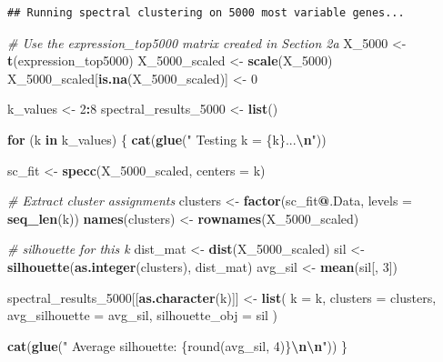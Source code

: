 \documentclass[
]{article}
\newenvironment{Shaded}{\begin{snugshade}}{\end{snugshade}}
\newcommand{\AttributeTok}[1]{\textcolor[rgb]{0.13,0.29,0.53}{#1}}
\newcommand{\CommentTok}[1]{\textcolor[rgb]{0.56,0.35,0.01}{\textit{#1}}}
\newcommand{\ControlFlowTok}[1]{\textcolor[rgb]{0.13,0.29,0.53}{\textbf{#1}}}
\newcommand{\DecValTok}[1]{\textcolor[rgb]{0.00,0.00,0.81}{#1}}
\newcommand{\FunctionTok}[1]{\textcolor[rgb]{0.13,0.29,0.53}{\textbf{#1}}}
\newcommand{\NormalTok}[1]{#1}
\newcommand{\OtherTok}[1]{\textcolor[rgb]{0.56,0.35,0.01}{#1}}
\newcommand{\SpecialCharTok}[1]{\textcolor[rgb]{0.81,0.36,0.00}{\textbf{#1}}}
\newcommand{\StringTok}[1]{\textcolor[rgb]{0.31,0.60,0.02}{#1}}
\begin{document}
\begin{verbatim}
## Running spectral clustering on 5000 most variable genes...
\end{verbatim}

\begin{Shaded}
\begin{Highlighting}[]
\CommentTok{\# Use the expression\_top5000 matrix created in Section 2a}
\NormalTok{X\_5000 }\OtherTok{\textless{}{-}} \FunctionTok{t}\NormalTok{(expression\_top5000)}
\NormalTok{X\_5000\_scaled }\OtherTok{\textless{}{-}} \FunctionTok{scale}\NormalTok{(X\_5000)}
\NormalTok{X\_5000\_scaled[}\FunctionTok{is.na}\NormalTok{(X\_5000\_scaled)] }\OtherTok{\textless{}{-}} \DecValTok{0}

\NormalTok{k\_values }\OtherTok{\textless{}{-}} \DecValTok{2}\SpecialCharTok{:}\DecValTok{8}
\NormalTok{spectral\_results\_5000 }\OtherTok{\textless{}{-}} \FunctionTok{list}\NormalTok{()}

\ControlFlowTok{for}\NormalTok{ (k }\ControlFlowTok{in}\NormalTok{ k\_values) \{}
  \FunctionTok{cat}\NormalTok{(}\FunctionTok{glue}\NormalTok{(}\StringTok{"  Testing k = \{k\}...}\SpecialCharTok{\textbackslash{}n}\StringTok{"}\NormalTok{))}
  
\NormalTok{  sc\_fit }\OtherTok{\textless{}{-}} \FunctionTok{specc}\NormalTok{(X\_5000\_scaled, }\AttributeTok{centers =}\NormalTok{ k)}
  
  \CommentTok{\# Extract cluster assignments}
\NormalTok{  clusters }\OtherTok{\textless{}{-}} \FunctionTok{factor}\NormalTok{(sc\_fit}\SpecialCharTok{@}\NormalTok{.Data, }\AttributeTok{levels =} \FunctionTok{seq\_len}\NormalTok{(k))}
  \FunctionTok{names}\NormalTok{(clusters) }\OtherTok{\textless{}{-}} \FunctionTok{rownames}\NormalTok{(X\_5000\_scaled)}
  
  \CommentTok{\# silhouette for this k}
\NormalTok{  dist\_mat }\OtherTok{\textless{}{-}} \FunctionTok{dist}\NormalTok{(X\_5000\_scaled)}
\NormalTok{  sil }\OtherTok{\textless{}{-}} \FunctionTok{silhouette}\NormalTok{(}\FunctionTok{as.integer}\NormalTok{(clusters), dist\_mat)}
\NormalTok{  avg\_sil }\OtherTok{\textless{}{-}} \FunctionTok{mean}\NormalTok{(sil[, }\DecValTok{3}\NormalTok{])}
  
\NormalTok{  spectral\_results\_5000[[}\FunctionTok{as.character}\NormalTok{(k)]] }\OtherTok{\textless{}{-}} \FunctionTok{list}\NormalTok{(}
    \AttributeTok{k =}\NormalTok{ k,}
    \AttributeTok{clusters =}\NormalTok{ clusters,}
    \AttributeTok{avg\_silhouette =}\NormalTok{ avg\_sil,}
    \AttributeTok{silhouette\_obj =}\NormalTok{ sil}
\NormalTok{  )}
  
  \FunctionTok{cat}\NormalTok{(}\FunctionTok{glue}\NormalTok{(}\StringTok{"    Average silhouette: \{round(avg\_sil, 4)\}}\SpecialCharTok{\textbackslash{}n\textbackslash{}n}\StringTok{"}\NormalTok{))}
\NormalTok{\}}
\end{Highlighting}
\end{Shaded}
\end{document}

